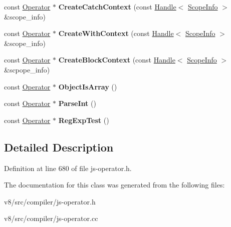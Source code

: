 \begin{DoxyCompactItemize}
\mbox{\label{classv8_1_1internal_1_1compiler_1_1JSOperatorBuilder_a98577b53256cbe671bd9c9ec3ec459f2}} 
const \mbox{\hyperlink{classv8_1_1internal_1_1compiler_1_1Operator}{Operator}} $\ast$ {\bfseries Create\+Catch\+Context} (const \mbox{\hyperlink{classv8_1_1internal_1_1Handle}{Handle}}$<$ \mbox{\hyperlink{classv8_1_1internal_1_1ScopeInfo}{Scope\+Info}} $>$ \&scope\+\_\+info)
\item 
\mbox{\label{classv8_1_1internal_1_1compiler_1_1JSOperatorBuilder_ab8c4e83d2f182b5ee66ed20bf2cd3649}} 
const \mbox{\hyperlink{classv8_1_1internal_1_1compiler_1_1Operator}{Operator}} $\ast$ {\bfseries Create\+With\+Context} (const \mbox{\hyperlink{classv8_1_1internal_1_1Handle}{Handle}}$<$ \mbox{\hyperlink{classv8_1_1internal_1_1ScopeInfo}{Scope\+Info}} $>$ \&scope\+\_\+info)
\item 
\mbox{\label{classv8_1_1internal_1_1compiler_1_1JSOperatorBuilder_abba314bf1268d6bc6e918e714e7e232b}} 
const \mbox{\hyperlink{classv8_1_1internal_1_1compiler_1_1Operator}{Operator}} $\ast$ {\bfseries Create\+Block\+Context} (const \mbox{\hyperlink{classv8_1_1internal_1_1Handle}{Handle}}$<$ \mbox{\hyperlink{classv8_1_1internal_1_1ScopeInfo}{Scope\+Info}} $>$ \&scpope\+\_\+info)
\item 
\mbox{\label{classv8_1_1internal_1_1compiler_1_1JSOperatorBuilder_aae96610bc33ffd5644ac186904c20306}} 
const \mbox{\hyperlink{classv8_1_1internal_1_1compiler_1_1Operator}{Operator}} $\ast$ {\bfseries Object\+Is\+Array} ()
\item 
\mbox{\label{classv8_1_1internal_1_1compiler_1_1JSOperatorBuilder_a0bb21648e9ea5c0fc73f1d68464ec6dc}} 
const \mbox{\hyperlink{classv8_1_1internal_1_1compiler_1_1Operator}{Operator}} $\ast$ {\bfseries Parse\+Int} ()
\item 
\mbox{\label{classv8_1_1internal_1_1compiler_1_1JSOperatorBuilder_a22a00381b4784744cbb3c6cc351fc4e4}} 
const \mbox{\hyperlink{classv8_1_1internal_1_1compiler_1_1Operator}{Operator}} $\ast$ {\bfseries Reg\+Exp\+Test} ()
\end{DoxyCompactItemize}


\subsection{Detailed Description}


Definition at line 680 of file js-\/operator.\+h.



The documentation for this class was generated from the following files\+:\begin{DoxyCompactItemize}
\item 
v8/src/compiler/js-\/operator.\+h\item 
v8/src/compiler/js-\/operator.\+cc\end{DoxyCompactItemize}
